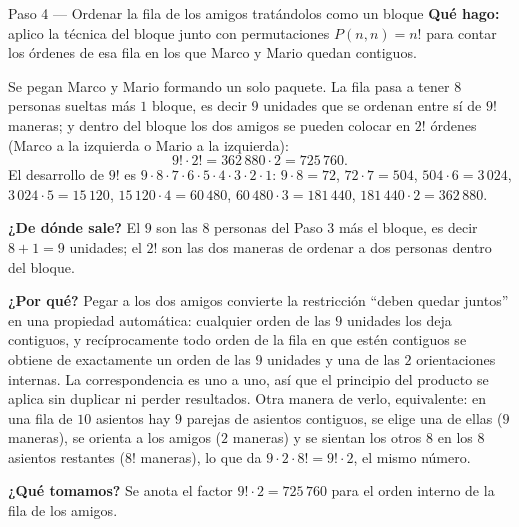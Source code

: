 \documentclass[11pt]{article}
\begin{document}
\begin{paso}{Paso 4 --- Ordenar la fila de los amigos tratándolos como un bloque}
\textbf{Qué hago:} aplico la técnica del bloque junto con permutaciones $P(n,n)=n!$ para contar los órdenes de esa fila en los que Marco y Mario quedan contiguos.

Se pegan Marco y Mario formando un solo paquete. La fila pasa a tener $8$ personas sueltas más $1$ bloque, es decir $9$ unidades que se ordenan entre sí de $9!$ maneras; y dentro del bloque los dos amigos se pueden colocar en $2!$ órdenes (Marco a la izquierda o Mario a la izquierda):
\[
  9!\cdot 2! = 362\,880\cdot 2 = 725\,760 .
\]
El desarrollo de $9!$ es $9\cdot 8\cdot 7\cdot 6\cdot 5\cdot 4\cdot 3\cdot 2\cdot 1$: $9\cdot 8=72$, $72\cdot 7=504$, $504\cdot 6=3\,024$, $3\,024\cdot 5=15\,120$, $15\,120\cdot 4=60\,480$, $60\,480\cdot 3=181\,440$, $181\,440\cdot 2=362\,880$.

\textbf{¿De dónde sale?} El $9$ son las $8$ personas del Paso 3 más el bloque, es decir $8+1=9$ unidades; el $2!$ son las dos maneras de ordenar a dos personas dentro del bloque.

\textbf{¿Por qué?} Pegar a los dos amigos convierte la restricción ``deben quedar juntos'' en una propiedad automática: cualquier orden de las $9$ unidades los deja contiguos, y recíprocamente todo orden de la fila en que estén contiguos se obtiene de exactamente un orden de las $9$ unidades y una de las $2$ orientaciones internas. La correspondencia es uno a uno, así que el principio del producto se aplica sin duplicar ni perder resultados. Otra manera de verlo, equivalente: en una fila de $10$ asientos hay $9$ parejas de asientos contiguos, se elige una de ellas ($9$ maneras), se orienta a los amigos ($2$ maneras) y se sientan los otros $8$ en los $8$ asientos restantes ($8!$ maneras), lo que da $9\cdot 2\cdot 8!=9!\cdot 2$, el mismo número.

\textbf{¿Qué tomamos?} Se anota el factor $9!\cdot 2=725\,760$ para el orden interno de la fila de los amigos.
\end{paso}
\end{document}
